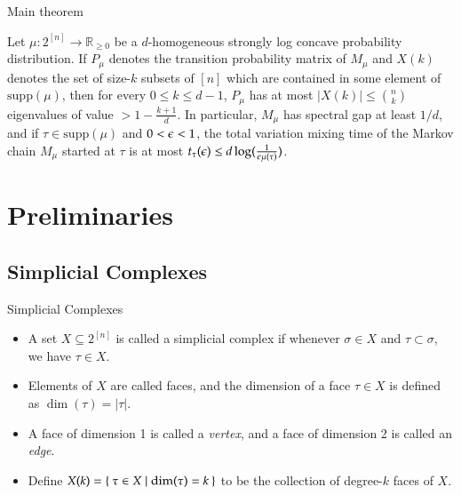 \documentclass[10pt]{beamer}
\newcommand{\R}{\mathbb{R}}
\newcommand{\supp}{\mathrm{supp}}
\begin{document}
\begin{frame}{Main theorem}
    \begin{theorem}[1.1]
        Let $\mu: 2^{[n]} \to \R_{\geq 0}$ be a $d$-homogeneous strongly log concave probability distribution. If $P_\mu$ denotes the transition probability matrix of $M_\mu$ and $X(k)$ denotes the set of size-$k$ subsets of $[n]$ which are contained in some element of $\supp(\mu)$, then for every $0 \leq k \leq d-1$, $P_\mu$ has at most $|X(k)| \leq {n \choose k}$ eigenvalues of value $> 1 - \frac{k+1}d$. In particular, $M_\mu$ has spectral gap at least $1/d$, and if $\tau \in \supp(\mu)$ and $0 < \epsilon < 1$, the total variation mixing time of the Markov chain $M_\mu$ started at $\tau$ is at most $t_\tau(\epsilon) \leq d\log(\frac{1}{\epsilon\mu(\tau)})$.
    \end{theorem}
\end{frame}

\section{Preliminaries}
\subsection{Simplicial Complexes}
\begin{frame}{Simplicial Complexes}
\begin{definition}
    \begin{itemize}
        \item A set $X \subseteq 2^{[n]}$ is called a simplicial complex if whenever $\sigma \in X$ and $\tau \subset \sigma$, we have $\tau \in X$.
        \item Elements of $X$ are called faces, and the dimension of a face $\tau \in X$ is defined as $\dim(\tau) = |\tau|$.
        \item A face of dimension 1 is called a \textit{vertex}, and a face of dimension 2 is called an \textit{edge}.
        \item Define $X(k) = \Set{\tau \in X \mid \dim(\tau) = k}$ to be the collection of degree-$k$ faces of $X$.
    \end{itemize}
\end{definition}
\end{frame}
\end{document}
